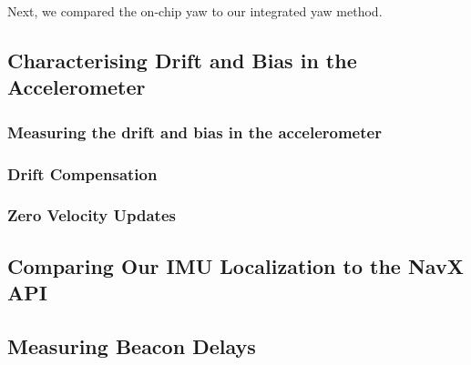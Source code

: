 \documentclass{article}
\begin{document}
    Next, we compared the on-chip yaw to our integrated yaw method. %


  \subsection{Characterising Drift and Bias in the Accelerometer}

    \subsubsection{Measuring the drift and bias in the accelerometer}


    \subsubsection{Drift Compensation}


    \subsubsection{Zero Velocity Updates}

  \subsection{Comparing Our IMU Localization to the NavX API} \label{section:navx_accuracy}


  \subsection{Measuring Beacon Delays}
\end{document}
